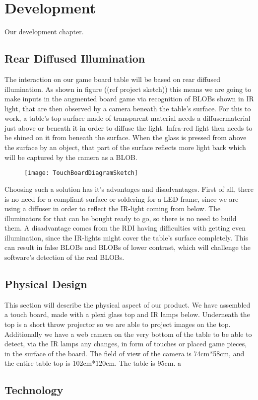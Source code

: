 \chapter{Development}\label{ch:development}
Our development chapter. 

\section{Rear Diffused Illumination}
The interaction on our game board table will be based on rear diffused illumination.\citep{multiTT} As shown in figure ((ref project sketch)) this means we are going to make inputs in the augmented board game via recognition of BLOBs shown in IR light, that are then observed by a camera beneath the table's surface. 
For this to work, a table's top surface made of transparent material needs a diffusermaterial just above or beneath it in order to diffuse the light. Infra-red light then needs to be shined on it from beneath the surface. When the glass is pressed from above the surface by an object, that part of the surface reflects more light back which will be captured by the camera as a BLOB.

\begin{figure}[!h]
\centering	\texttt{[image: TouchBoardDiagramSketch]}
\end{figure}

Choosing such a solution has it's advantages and disadvantages. First of all, there is no need for a compliant surface or soldering for a LED frame, since we are using a diffuser in order to reflect the IR-light coming from below. The illuminators for that can be bought ready to go, so there is no need to build them. A disadvantage comes from the RDI having difficulties with getting even illumination, since the IR-lights might cover the table's surface completely. This can result in false BLOBs and BLOBs of lower contrast, which will challenge the software's detection of the real BLOBs.

\section{Physical Design} 
This section will describe the physical aspect of our product.
We have assembled a touch board, made with a plexi glass top and IR lamps below. Underneath the top is a short throw projector so we are able to project images on the top. Additionally we have a web camera on the very bottom of the table to be able to detect, via the IR lamps any changes, in form of touches or placed game pieces, in the surface of the board. 
The field of view of the camera is 74cm*58cm, and the entire table top is 102cm*120cm. The table is 95cm. 
a

\section{Technology}

